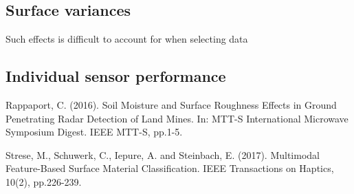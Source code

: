 \documentclass[a4paper, 12pt]{article}
\begin{document}

\subsection{Surface variances}

Such effects is difficult to account for when selecting data 

\subsection{Individual sensor performance}


\begin{thebibliography}{9}

Rappaport, C. (2016). Soil Moisture and Surface Roughness Effects in Ground Penetrating Radar Detection of Land Mines. In: MTT-S International Microwave Symposium Digest. IEEE MTT-S, pp.1-5.

Strese, M., Schuwerk, C., Iepure, A. and Steinbach, E. (2017). Multimodal Feature-Based Surface Material Classification. IEEE Transactions on Haptics, 10(2), pp.226-239.

\end{thebibliography}
\end{document}

